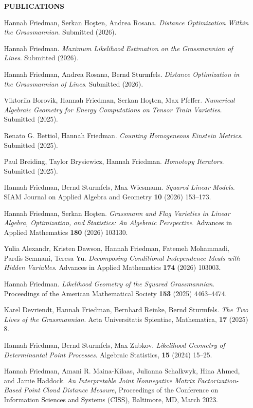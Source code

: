 \documentclass[11pt]{article}
\newcommand{\hdr}[1]{\textcolor{blue(ryb)}{\textbf{#1}}}
\begin{document}
\hdr{PUBLICATIONS}\\
\begin{etaremune}
  \item Hannah Friedman, Serkan Ho\c{s}ten, Andrea Rosana.
  \emph{Distance Optimization Within the Grassmannian}. Submitted (2026). 
\item Hannah Friedman.
  \emph{Maximum Likelihood Estimation on the Grassmannian of Lines}. Submitted (2026).
\item Hannah Friedman, Andrea Rosana, Bernd Sturmfels.
  \emph{Distance Optimization in the Grassmannian of Lines}. Submitted (2026). 
\item Viktoriia Borovik, Hannah Friedman, Serkan Ho\c{s}ten, Max Pfeffer.
  \emph{Numerical Algebraic Geometry for Energy Computations on Tensor Train Varieties}.
  Submitted (2025). 
\item Renato G. Bettiol, Hannah Friedman.
  \emph{Counting Homogeneous Einstein Metrics}.
  Submitted (2025).
\item Paul Breiding, Taylor Brysiewicz, Hannah Friedman.
  \emph{Homotopy Iterators}.
  Submitted (2025). 
\item Hannah Friedman, Bernd Sturmfels, Max Wiesmann.
  \emph{Squared Linear Models}.
  SIAM Journal on Applied Algebra and Geometry
  {\bf 10} (2026) 153--173. 
\item Hannah Friedman, Serkan Ho\c{s}ten.
  \textit{Grassmann and Flag Varieties in Linear Algebra, Optimization, and Statistics: An Algebraic Perspective}.
  Advances in Applied Mathematics
  {\bf 180} (2026) 103130. 
\item Yulia Alexandr, Kristen Dawson, Hannah Friedman, Fatemeh Mohammadi, Pardis Semnani, Teresa Yu.
  \emph{Decomposing Conditional Independence Ideals with Hidden Variables}.
  Advances in Applied Mathematics
  {\bf 174} (2026) 103003.
\item Hannah Friedman.
  \emph{Likelihood Geometry of the Squared Grassmannian}.
  Proceedings of the American Mathematical Society \textbf{153} (2025) 4463--4474.
  \item Karel Devriendt, Hannah Friedman, Bernhard Reinke, Bernd Sturmfels.
    \emph{The Two Lives of the Grassmannian}.
    Acta Universitatis Spientiae, Mathematica, \textbf{17} (2025) 8. 
\item Hannah Friedman, Bernd Sturmfels, Max Zubkov.
  \emph{Likelihood Geometry of Determinantal Point Processes}.
  Algebraic Statistics, \textbf{15} (2024) 15--25.
\item Hannah Friedman, Amani R. Maina-Kilaas, Julianna Schalkwyk, Hina Ahmed, and Jamie Haddock. 
  \emph{An Interpretable Joint Nonnegative Matrix Factorization-Based Point Cloud Distance Measure}, Proceedings of the Conference on Information Sciences and Systems (CISS), Baltimore, MD, March 2023.
\end{etaremune}
\end{document}
